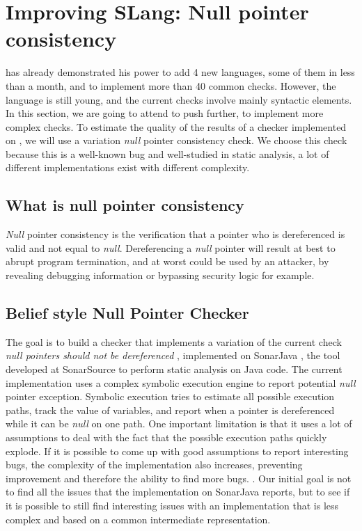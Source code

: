 \section{Improving SLang: Null pointer consistency}
\label{sec:improving_slang}

\slang{} has already demonstrated his power to add 4 new languages, some of them in less than a month, and to implement more than 40 common checks. 
However, the language is still young, and the current checks involve mainly syntactic elements. 
In this section, we are going to attend to push \slang{} further, to implement more complex checks.
To estimate the quality of the results of a checker implemented on \slang{}, we will use a variation \emph{null} pointer consistency check. 
We choose this check because this is a well-known bug and well-studied in static analysis, a lot of different implementations exist with different complexity.

\subsection{What is null pointer consistency}
\label{subsec:null_pointer_consistency}

\emph{Null} pointer consistency is the verification that a pointer who is dereferenced is valid and not equal to \emph{null}. Dereferencing a \emph{null} pointer will result at best to abrupt program termination, and at worst could be used by an attacker, by revealing debugging information or bypassing security logic for example.

\subsection{Belief style Null Pointer Checker}
\label{subsec:belief_style}

The goal is to build a checker that implements a variation of the current check \emph{null pointers should not be dereferenced} \cite{RSPEC-2259:2019:Online}, implemented on SonarJava \cite{SonarJava:2019:Online}, the tool developed at SonarSource to perform static analysis on Java code.
The current implementation uses a complex symbolic execution engine to report potential \emph{null} pointer exception.
Symbolic execution tries to estimate all possible execution paths, track the value of variables, and report when a pointer is dereferenced while it can be \emph{null} on one path.
One important limitation is that it uses a lot of assumptions to deal with the fact that the possible execution paths quickly explode. 
If it is possible to come up with good assumptions to report interesting bugs, the complexity of the implementation also increases, preventing improvement and therefore the ability to find more bugs. \cite{Brown:2016:BSC:2954679.2872364}. 
Our initial goal is not to find all the issues that the implementation on SonarJava reports, but to see if it is possible to still find interesting issues with an implementation that is less complex and based on a common intermediate representation.

